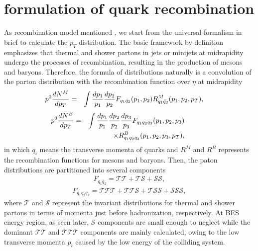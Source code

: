 \documentclass[twocolumn,aps,superscriptaddress,showpacs,nofootinbib,floatfix]{revtex4}
\begin{document}
%

\section{formulation of quark recombination}\label{RM2}
As recombination model mentioned \cite{2u,3c,4u,5i}, we start from the universal formalism in brief to calculate the $p_T$ distribution. The basic framework by definition emphasizes that thermal and shower partons in jets or minijets at midrapidity undergo the processes of recombination, resulting in the production of mesons and baryons. Therefore, the formula of distributions naturally is a convolution of the parton distribution with the recombination function over $\eta$ at midrapidity
\begin{eqnarray}
\hspace{-0.5cm}p^0{dN^M\over dp_T}&=&\int {dp_1\over p_1}{dp_2\over p_2} F_{q_1\bar q_2}(p_1,p_2) R_{q_1\bar q_2}^M(p_1,p_2,p_T), 
\label{2.1}
\end{eqnarray}
\begin{eqnarray}
\hspace{-1.5cm}p^0{dN^B\over dp_T}&=&\int {dp_1\over p_1}{dp_2\over p_2}{dp_3\over p_3} F_{q_1q_2q_3}(p_1,p_2,p_3)\nonumber\\ 
&&\times {R}_{q_1q_2q_3}^B(p_1,p_2,p_3,p_T),   
\label{2.2}
\end{eqnarray}
in which $q_i$ means the transverse momenta of quarks and $R^{M}$ and $R^{B}$ represents the recombination functions for mesons and baryons. Then, the paton distributions are partitioned into several components
\begin{eqnarray}
F_{q_1\bar q_2}=\mathcal T\mathcal T+\mathcal T\mathcal S+\mathcal S\mathcal S,
\label{2.3}
\end{eqnarray}
\begin{eqnarray}
F_{q_1 q_2 q_3}=\mathcal T\mathcal T\mathcal T+\mathcal T\mathcal T\mathcal S+\mathcal T\mathcal S\mathcal S+\mathcal S\mathcal S\mathcal S,
\label{2.4}
\end{eqnarray}
where $\mathcal{T}$ and $\mathcal{S}$ represent the invariant distributions for thermal and shower partons in terms of momenta just before hadronization, respectively. At BES energy region, as seen later, $\mathcal{S}$ components are small enough to neglect while the dominant $\mathcal{TT}$ and $\mathcal{TTT}$ components are mainly calculated, owing to the low transverse momenta $p_i$ caused by the low energy of the colliding system.
\end{document}
